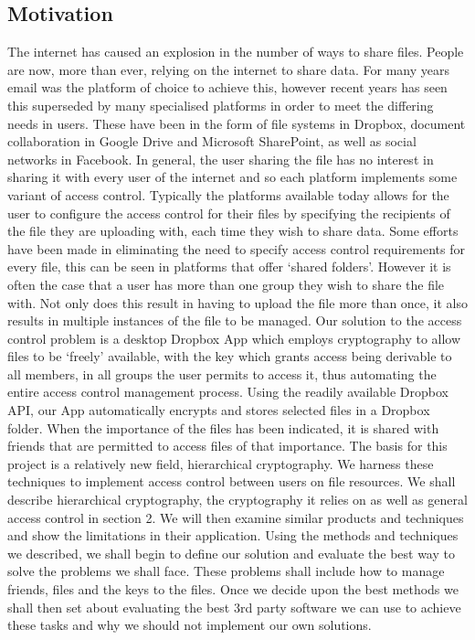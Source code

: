 \documentclass[12pt, titlepage]{article}
\begin{document}
\subsection{Motivation}
The internet has caused an explosion in the number of ways to share files. People are now, more than ever, relying on the internet to share data. For many years email was the platform of choice to achieve this, however recent years has seen this superseded by many specialised platforms in order to meet the differing needs in users. These have been in the form of file systems in Dropbox, document collaboration in Google Drive and Microsoft SharePoint, as well as social networks in Facebook. In general, the user sharing the file has no interest in sharing it with every user of the internet and so each platform implements some variant of access control. Typically the platforms available today allows for the user to configure the access control for their files by specifying the recipients of the file they are uploading with, each time they wish to share data. Some efforts have been made in eliminating the need to specify access control requirements for every file, this can be seen in platforms that offer `shared folders'. However it is often the case that a user has more than one group they wish to share the file with. Not only does this result in having to upload the file more than once, it also results in multiple instances of the file to be managed. Our solution to the access control problem is a desktop Dropbox App which employs cryptography to allow files to be `freely' available, with the key which grants access being derivable to all members, in all groups the user permits to access it, thus automating the entire access control management process. Using the readily available Dropbox API, our App automatically encrypts and stores selected files in a Dropbox folder. When the importance of the files has been indicated, it is shared with friends that are permitted to access files of that importance.
\newline
\newline \indent The basis for this project is a relatively new field, hierarchical cryptography. We harness these techniques to implement access control between users on file resources. We shall describe hierarchical cryptography, the cryptography it relies on as well as general access control in section 2. We will then examine similar products and techniques and show the limitations in their application.
\newline \indent Using the methods and techniques we described, we shall begin to define our solution and evaluate the best way to solve the problems we shall face. These problems shall include how to manage friends, files and the keys to the files. Once we decide upon the best methods we shall then set about evaluating the best 3rd party software we can use to achieve these tasks and why we should not implement our own solutions.
\end{document}
